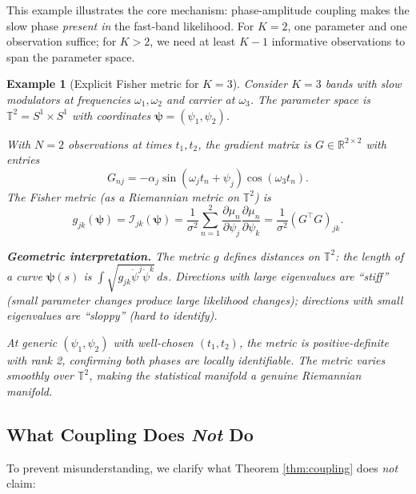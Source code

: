 \documentclass[12pt]{article}
\newtheorem{example}[theorem]{Example}
\newcommand{\R}{\mathbb{R}}
\newcommand{\T}{\mathbb{T}}
\newcommand{\FIM}{\mathcal{I}}
\begin{document}
This example illustrates the core mechanism: phase-amplitude coupling makes the slow phase \emph{present in} the fast-band likelihood. For $K=2$, one parameter and one observation suffice; for $K > 2$, we need at least $K-1$ informative observations to span the parameter space.

\begin{example}[Explicit Fisher metric for $K=3$]
\label{ex:fisher_metric_K3}
Consider $K=3$ bands with slow modulators at frequencies $\omega_1, \omega_2$ and carrier at $\omega_3$. The parameter space is $\T^2 = S^1 \times S^1$ with coordinates $\bm{\psi} = (\psi_1, \psi_2)$.

With $N=2$ observations at times $t_1, t_2$, the gradient matrix is $G \in \R^{2 \times 2}$ with entries
\[
G_{nj} = -\alpha_j \sin(\omega_j t_n + \psi_j)\cos(\omega_3 t_n).
\]
The Fisher metric (as a Riemannian metric on $\T^2$) is
\begin{equation}
g_{jk}(\bm{\psi}) = \FIM_{jk}(\bm{\psi}) = \frac{1}{\sigma^2}\sum_{n=1}^{2} \frac{\partial \mu_n}{\partial \psi_j}\frac{\partial \mu_n}{\partial \psi_k} = \frac{1}{\sigma^2}(G^\top G)_{jk}.
\end{equation}

\textbf{Geometric interpretation.} The metric $g$ defines distances on $\T^2$: the length of a curve $\bm{\psi}(s)$ is $\int \sqrt{g_{jk}\dot\psi^j\dot\psi^k}\,ds$. Directions with large eigenvalues are ``stiff'' (small parameter changes produce large likelihood changes); directions with small eigenvalues are ``sloppy'' (hard to identify).

At generic $(\psi_1, \psi_2)$ with well-chosen $(t_1, t_2)$, the metric is positive-definite with rank 2, confirming both phases are locally identifiable. The metric varies smoothly over $\T^2$, making the statistical manifold a genuine Riemannian manifold.
\end{example}

\subsection{What Coupling Does \emph{Not} Do}

To prevent misunderstanding, we clarify what Theorem \ref{thm:coupling} does \emph{not} claim:
\end{document}
